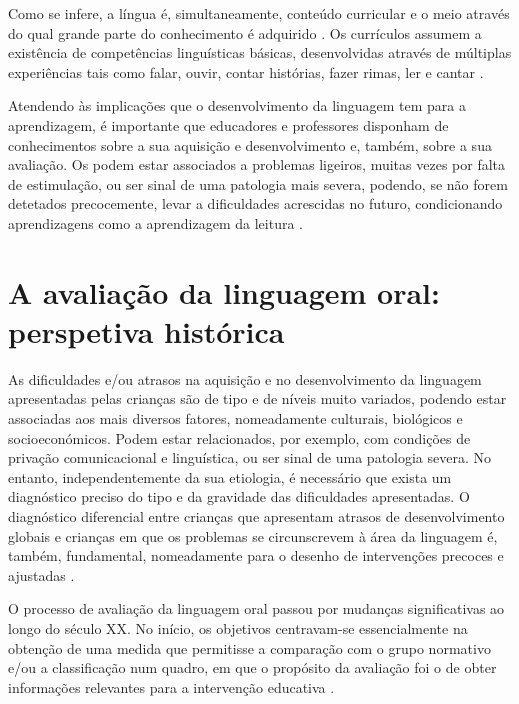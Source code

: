 \documentclass[output=paper]{LSP/langsci}
\begin{document}
Como se infere, a língua é, simultaneamente, conteúdo curricular e o meio através do qual grande parte do conhecimento é adquirido \citep{cazden1973}. Os currículos assumem a existência de competências linguísticas básicas, desenvolvidas através de múltiplas experiências tais como falar, ouvir, contar histórias, fazer rimas, ler e cantar \citep{brockrankin2010,whitehead2007}.

Atendendo às implicações que o desenvolvimento da linguagem tem para a aprendizagem, é importante que educadores e professores disponham de conhecimentos sobre a sua aquisição e desenvolvimento e, também, sobre a sua avaliação. Os  podem estar associados a problemas ligeiros, muitas vezes por falta de estimulação, ou ser sinal de uma patologia mais severa, podendo, se não forem detetados precocemente, levar a dificuldades acrescidas no futuro, condicionando aprendizagens como a aprendizagem da leitura \citep{mcguinness2006}. 

\section{A avaliação da linguagem oral: perspetiva histórica}
\label{sec:viana_avaliacao_historica}

As dificuldades e/ou atrasos na aquisição e no desenvolvimento da linguagem apresentadas pelas crianças são de tipo e de níveis muito variados, podendo estar associadas aos mais diversos fatores, nomeadamente culturais, biológicos e socioeconómicos. Podem estar relacionados, por exemplo, com condições de privação comunicacional e linguística, ou ser sinal de uma patologia severa. No entanto, independentemente da sua etiologia, é necessário que exista um diagnóstico preciso do tipo e da gravidade das dificuldades apresentadas. O diagnóstico diferencial entre crianças que apresentam atrasos de desenvolvimento globais e crianças em que os problemas se circunscrevem à área da linguagem é, também, fundamental, nomeadamente para o desenho de intervenções precoces e ajustadas \citep{mariscallopezornat2010,mariscal_etal2007,neaum2012,westerlund_etal2006}. 

O processo de avaliação da linguagem oral passou por mudanças significativas ao longo do século XX. No início, os objetivos centravam-se essencialmente na obtenção de uma medida que permitisse a comparação com o grupo normativo e/ou a classificação num quadro, em que o propósito da avaliação foi o de obter informações relevantes para a intervenção educativa \citep{puyuelo2003}.
\end{document}
